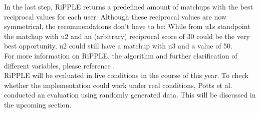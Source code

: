 \documentclass[nochapterpage,bigchapter,linedtoc,longdoc,colorback,accentcolor=tud3b,oneside]{tudreport}
\begin{document}
In the last step, RiPPLE returns a predefined amount of matchups with the best reciprocal values for each user. Although these reciprocal values are now symmetrical, the recommendations don't have to be: While from u1s standpoint the matchup with u2 and an (arbitrary) reciprocal score of 30 could be the very best opportunity, u2 could still have a matchup with u3 and a value of 50.\\
For more information on RiPPLE, the algorithm and further clarification of different variables, please reference \cite{potts2018reciprocal}.\\	
RiPPLE will be evaluated in live conditions in the course of this year. To check whether the implementation could work under real conditions, Potts et al. conducted an evaluation using randomly generated data. This will be discussed in the upcoming section.\\
\end{document}

